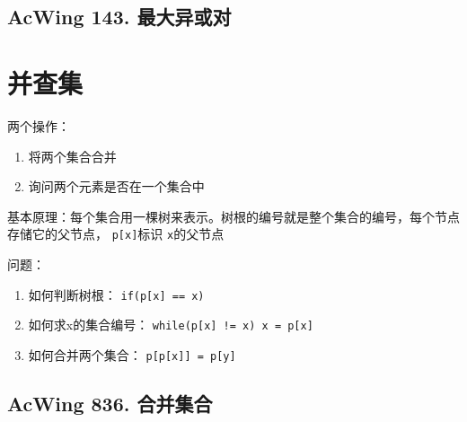 \subsection{AcWing 143. 最大异或对}

\section{并查集}

两个操作：

\begin{enumerate}
    \item 将两个集合合并
    \item 询问两个元素是否在一个集合中
\end{enumerate}

基本原理：每个集合用一棵树来表示。树根的编号就是整个集合的编号，每个节点存储它的父节点， \lstinline{p[x]}标识 \lstinline{x}的父节点

问题：

\begin{enumerate}
    \item 如何判断树根： \lstinline{if(p[x] == x)}
    \item 如何求x的集合编号： \lstinline{while(p[x] != x) x = p[x]}
    \item 如何合并两个集合： \lstinline{p[p[x]] = p[y]}
\end{enumerate}

\subsection{AcWing 836. 合并集合}

